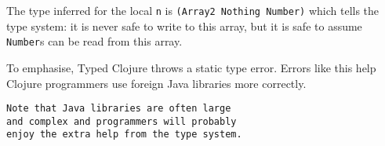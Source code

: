 The type inferred for the local \lstinline|n| is \lstinline|(Array2 Nothing Number)|
which tells the type system: it is never safe to write to this array, but
it is safe to assume \lstinline|Number|s can be read from this array.

To emphasise, Typed Clojure throws a static type error. Errors like this help Clojure programmers
use foreign Java libraries more correctly.

\begin{verbatim}
Note that Java libraries are often large 
and complex and programmers will probably
enjoy the extra help from the type system.
\end{verbatim}
